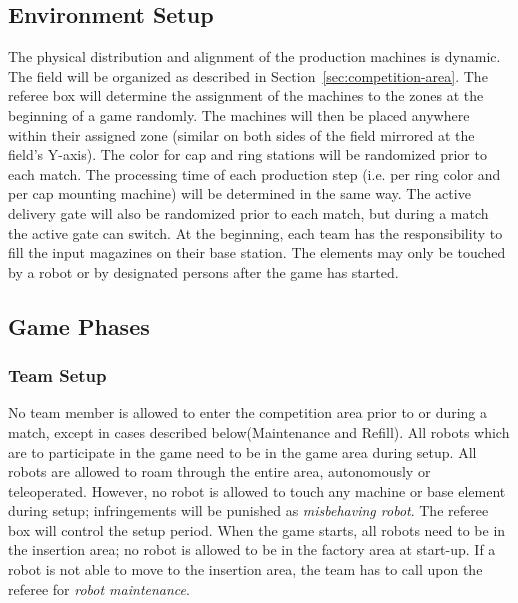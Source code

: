 \documentclass[12pt,twoside]{article}
\newcommand{\refsec}[1]{Section~\ref{#1}}
\begin{document}
\subsection{Environment Setup}
\label{sec:env-setup}
The physical distribution and alignment of the production machines is
dynamic. The field will be organized as described in
\refsec{sec:competition-area}. The referee box will determine the
assignment of the machines to the zones at the beginning of a game
randomly. The machines will then be placed anywhere within their
assigned zone (similar on both sides of the field mirrored at the
field's Y-axis). The color for cap and ring stations will be
randomized prior to each match. The processing time of each production
step (i.e. per ring color and per cap mounting machine) will be
determined in the same way. The active delivery gate will also be
randomized prior to each match, but during a match the active gate can
switch. At the beginning, each team has the responsibility to fill the
input magazines on their base station. The elements may only be
touched by a robot or by designated persons after the game has started.

\subsection{Game Phases}
\label{sec:game-phases}

\subsubsection{Team Setup}
\label{sec:team-setup}
No team member is allowed to enter the competition area prior to or
during a match, except in cases described below(Maintenance and Refill). 
All robots which are to participate in the game need
to be in the game area during setup. All robots are allowed to roam
through the entire area, autonomously or teleoperated. However, no
robot is allowed to touch any machine or base element during setup;
infringements will be punished as \textit{misbehaving robot}. The
referee box will control the setup period. When the game starts, all
robots need to be in the insertion area; no robot is allowed to be in
the factory area at start-up. If a robot is not able to move to the
insertion area, the team has to call upon the referee for
\textit{robot maintenance}.


\end{document}
